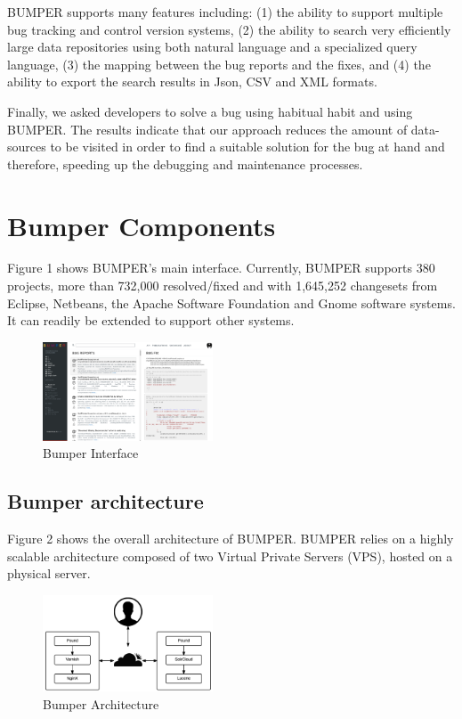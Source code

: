 \documentclass[conference]{IEEEtran}
\begin{document}
BUMPER supports many features including: (1) the ability to support multiple bug tracking and control version systems, (2) the ability to search very efficiently large data repositories using both natural language and a specialized query language, (3) the mapping between the bug reports and the fixes, and (4) the ability to export the search results in Json, CSV and XML formats.

Finally, we asked developers to solve a bug using habitual habit and using BUMPER. The results indicate that our approach reduces the amount of data-sources to be visited in order to find a suitable solution for the bug at hand and therefore, speeding up the debugging and maintenance processes.

\section{Bumper Components}
\label{sec:Bumper Components}

Figure 1 shows BUMPER’s main interface. Currently, BUMPER supports 380 projects, more than 732,000 resolved/fixed and with 1,645,252 changesets from Eclipse, Netbeans, the Apache Software Foundation and Gnome software systems. It can readily be extended to support other systems.


\begin{figure}
  \centering
  \includegraphics[width=0.45\textwidth]{media/interface.png}
  \caption{Bumper Interface}
\end{figure}




\subsection{Bumper architecture}
\label{sub:Bumper architecture}

Figure 2 shows the overall architecture of BUMPER. BUMPER relies on a highly scalable architecture composed of two Virtual Private Servers (VPS), hosted on a physical server.

\begin{figure}
  \centering
  \includegraphics[width=0.45\textwidth]{media/archi.png}
  \caption{Bumper Architecture}
\end{figure}
\end{document}
